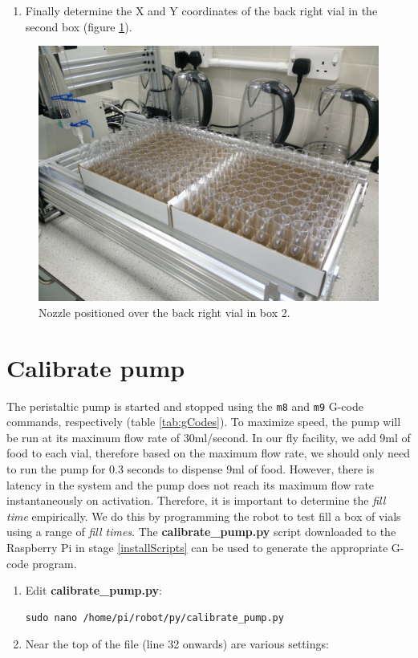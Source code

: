 \documentclass[]{book}
\providecommand{\tightlist}{%
  \setlength{\itemsep}{0pt}\setlength{\parskip}{0pt}}
\theoremstyle{definition}
\theoremstyle{definition}
\theoremstyle{remark}
\begin{document}
\begin{enumerate}
\def\labelenumi{\arabic{enumi}.}
\setcounter{enumi}{7}
\tightlist
\item
  Finally determine the X and Y coordinates of the back right vial in
  the second box (figure \ref{fig:box2BackRight}).
\end{enumerate}

\begin{figure}

{\centering \includegraphics[width=0.5\linewidth]{images/box2_last_vial} 

}

\caption{Nozzle positioned over the back right vial in box 2.}\label{fig:box2BackRight}
\end{figure}

\section{Calibrate pump}\label{calibrate-pump}

The peristaltic pump is started and stopped using the \texttt{m8} and
\texttt{m9} G-code commands, respectively (table \ref{tab:gCodes}). To
maximize speed, the pump will be run at its maximum flow rate of
30ml/second. In our fly facility, we add 9ml of food to each vial,
therefore based on the maximum flow rate, we should only need to run the
pump for 0.3 seconds to dispense 9ml of food. However, there is latency
in the system and the pump does not reach its maximum flow rate
instantaneously on activation. Therefore, it is important to determine
the \emph{fill time} empirically. We do this by programming the robot to
test fill a box of vials using a range of \emph{fill times}. The
\textbf{calibrate\_pump.py} script downloaded to the Raspberry Pi in
stage \ref{installScripts} can be used to generate the appropriate
G-code program.

\begin{enumerate}
\def\labelenumi{\arabic{enumi}.}
\item
  Edit \textbf{calibrate\_pump.py}:

\begin{verbatim}
sudo nano /home/pi/robot/py/calibrate_pump.py
\end{verbatim}
\item
  Near the top of the file (line 32 onwards) are various settings:
\end{enumerate}
\end{document}
